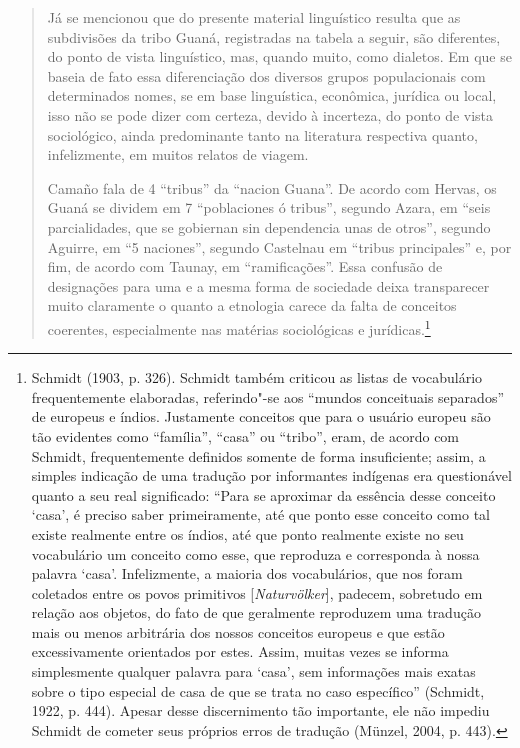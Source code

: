 \begin{quote}
Já se mencionou que do presente material linguístico resulta que as
subdivisões da tribo Guaná, registradas na tabela a seguir, são
diferentes, do ponto de vista linguístico, mas, quando muito, como
dialetos. Em que se baseia de fato essa diferenciação dos diversos
grupos populacionais com determinados nomes, se em base linguística,
econômica, jurídica ou local, isso não se pode dizer com certeza, devido
à incerteza, do ponto de vista sociológico, ainda predominante tanto na
literatura respectiva quanto, infelizmente, em muitos relatos de
viagem.

Camaño fala de 4 ``tribus'' da ``nacion Guana''. De acordo com Hervas,
os Guaná se dividem em 7 ``poblaciones ó tribus'', segundo Azara, em
``seis parcialidades, que se gobiernan sin dependencia unas de otros'',
segundo Aguirre, em ``5 naciones'', segundo Castelnau em ``tribus
principales'' e, por fim, de acordo com Taunay, em ``ramificações''.
Essa confusão de designações para uma e a mesma forma de sociedade
deixa transparecer muito claramente o quanto a etnologia carece da falta
de conceitos coerentes, especialmente nas matérias sociológicas e
jurídicas.\footnote{Schmidt (1903, p. 326). Schmidt também criticou as
  listas de vocabulário frequentemente elaboradas, referindo"-se aos
  ``mundos conceituais separados'' de europeus e índios. Justamente
  conceitos que para o usuário europeu são tão evidentes como
  ``família'', ``casa'' ou ``tribo'', eram, de acordo com Schmidt,
  frequentemente definidos somente de forma insuficiente; assim, a
  simples indicação de uma tradução por informantes indígenas era
  questionável quanto a seu real significado: ``Para se aproximar da
  essência desse conceito `casa', é preciso saber primeiramente, até que
  ponto esse conceito como tal existe realmente entre os índios, até que
  ponto realmente existe no seu vocabulário um conceito como esse, que
  reproduza e corresponda à nossa palavra `casa'. Infelizmente, a
  maioria dos vocabulários, que nos foram coletados entre os povos
  primitivos {[}\emph{Naturvölker}{]}, padecem, sobretudo em relação aos
  objetos, do fato de que geralmente reproduzem uma tradução mais ou
  menos arbitrária dos nossos conceitos europeus e que estão
  excessivamente orientados por estes. Assim, muitas vezes se informa
  simplesmente qualquer palavra para `casa', sem informações mais exatas
  sobre o tipo especial de casa de que se trata no caso específico''
  (Schmidt, 1922, p. 444). Apesar desse discernimento tão importante,
  ele não impediu Schmidt de cometer seus próprios erros de tradução
  (Münzel, 2004, p. 443).}
\end{quote}

